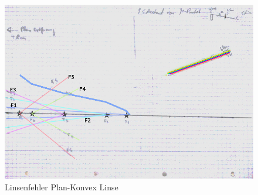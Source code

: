 \documentclass[12pt,a4paper]{article}
\begin{document}
\begin{figure}[H]
	\centering
	\includegraphics[scale=0.45]{./figure/plan_konvex.png}
	\caption{Linsenfehler Plan-Konvex Linse}
	\label{fig:linsenfehler_strahlen_plan_konvex}
\end{figure}
\end{document}
